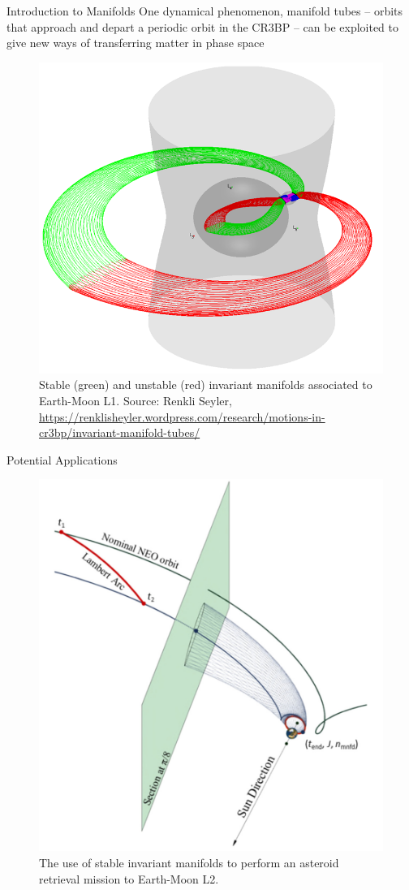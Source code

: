 \documentclass[10pt]{beamer}
\begin{document}
\begin{frame}[fragile]{Introduction to Manifolds}
	\small One dynamical phenomenon, manifold tubes -- orbits that approach and depart a periodic orbit in the CR3BP -- can be exploited to give new ways of transferring matter in phase space
	\begin{figure}
		\centering
		\includegraphics[height=.4\textheight]{manifolds}
		\caption{\small Stable (green) and unstable (red) invariant manifolds associated to Earth-Moon L1. Source: Renkli Seyler, \url{https://renklisheyler.wordpress.com/research/motions-in-cr3bp/invariant-manifold-tubes/}}
	\end{figure}
\end{frame}

\begin{frame}{Potential Applications}
	\begin{figure}
		\centering
		\includegraphics[height=.5\linewidth]{neo_retrieval.png}
		\caption{The use of stable invariant manifolds to perform an asteroid retrieval mission to Earth-Moon L2. \cite{Sanchez2016}}
	\end{figure}
\end{frame}
\end{document}
